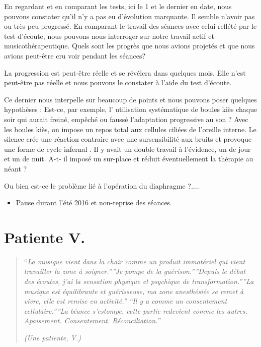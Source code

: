 \documentclass[12pt,french]{report}
\begin{document}
En regardant et en comparant les tests, ici le 1\textdegree{} et le
dernier en date, nous pouvons constater qu'il n'y a pas eu d'évolution
marquante. Il semble n'avoir pas ou très peu progressé. En comparant
le travail des séances avec celui reflété par le test d'écoute, nous
pouvons nous interroger sur notre travail actif et musicothérapeutique.
Quels sont les progrès que nous avions projetés et que nous avions
peut-être cru voir pendant les séances? 

La progression est peut-être réelle et se révélera dans quelques mois.
Elle n'est peut-être pas réelle et nous pouvons le constater à l'aide
du test d'écoute. 

Ce dernier nous interpelle sur beaucoup de points et nous pouvons
poser quelques hypothèses : Est-ce, par exemple, l' utilisation systématique
de boules kiès chaque soir qui aurait freiné, empêché ou faussé l'adaptation
progressive au son ? Avec les boules kiès, on impose un repos total
aux cellules ciliées de l'oreille interne. Le silence crée une réaction
contraire avec une sursensibilité aux bruits et provoque une forme
de cycle infernal . Il y avait un double travail à l'évidence, un
de jour et un de nuit. A-t- il imposé un sur-place et réduit éventuellement
la thérapie au néant ?

Ou bien est-ce le problème lié à l'opération du diaphragme ?....
\begin{itemize}
\item Pause durant l'été 2016 et non-reprise des séances.
\end{itemize}

\section{Patiente V. }
\begin{quotation}
``\emph{La musique vient dans la chair comme un produit immatériel
qui vient travailler la zone à soigner.''{}''Je pompe de la guérison.''{}''Depuis
le début des écoutes, j'ai la sensation physique et psychique de transformation.''{}''La
musique est équilibrante et guérisseuse, ma zone anesthésiée se remet
à vivre, elle est remise en activité.'' ``Il y a comme un consentement
cellulaire.''{}''La béance s'estompe, cette partie} \emph{redevient
comme les autres. Apaisement. Consentement. Réconciliation.''}

\emph{(Une patiente, V.)}

\emph{}
\begin{figure}[tph]
\end{figure}
\end{quotation}
\end{document}
